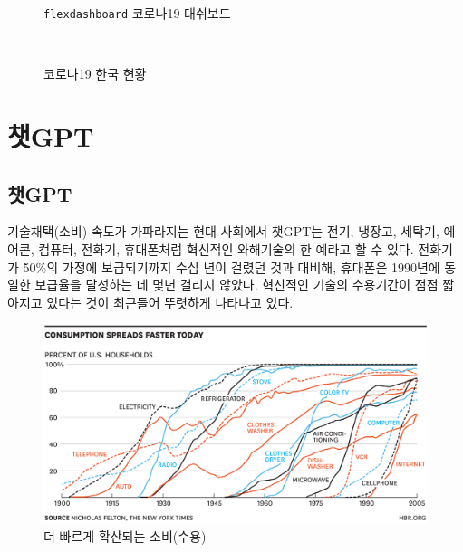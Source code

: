 \documentclass[
  letterpaper,
]{book}
\begin{document}
\begin{figure}
\begin{minipage}[t]{0.49\linewidth}
{{}

\caption{코로나19 한국 현황}

}

\end{minipage}%
\newline
\begin{minipage}[t]{0.49\linewidth}

{\centering 

\texttt{flexdashboard} 코로나19 대쉬보드

}

\end{minipage}%
%
\begin{minipage}[t]{0.01\linewidth}

{\centering 

~

}

\end{minipage}%

\end{figure}

\part{챗GPT}

\hypertarget{uxcc57gpt-1}{%
\chapter{챗GPT}\label{uxcc57gpt-1}}

기술채택(소비) 속도가 가파라지는 현대 사회에서 챗GPT는 전기, 냉장고,
세탁기, 에어콘, 컴퓨터, 전화기, 휴대폰처럼 혁신적인 와해기술의 한 예라고
할 수 있다. 전화기가 50\%의 가정에 보급되기까지 수십 년이 걸렸던 것과
대비해, 휴대폰은 1990년에 동일한 보급율을 달성하는 데 몇년 걸리지
않았다. 혁신적인 기술의 수용기간이 점점 짧아지고 있다는 것이 최근들어
뚜렷하게 나타나고 있다. \autocite{McGrath2013}

\begin{figure}

{\centering \includegraphics{images/gpt_adoption_hbr.png}

}

\caption{더 빠르게 확산되는 소비(수용)}

\end{figure}
\end{document}
